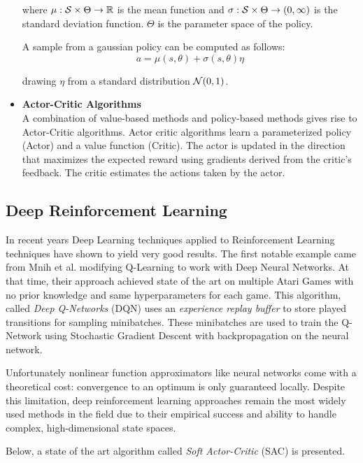\begin{itemize}
where $\mu: \mathcal{S} \times \Theta \to \mathbb{R}$ is the mean function and $\sigma: \mathcal{S} \times \Theta \to (0, \infty)$ is the standard deviation function.
$\Theta$ is the parameter space of the policy.

A sample from a gaussian policy can be computed as follows:
\begin{equation*}
    a = \mu(s, \theta) + \sigma(s, \theta) \eta
\end{equation*}

drawing $\eta$ from a standard distribution $\mathcal{N}(0,1)$.



\item \textbf{Actor-Critic Algorithms} \\
A combination of value-based methods and policy-based methods gives rise to Actor-Critic algorithms. Actor critic algorithms
learn a parameterized policy (Actor) and a value function (Critic).
The actor is updated in the direction that maximizes the expected reward using gradients derived from the critic's feedback.
The critic estimates the actions taken by the actor.

\end{itemize}

\subsection{Deep Reinforcement Learning}
In recent years Deep Learning techniques applied to Reinforcement Learning techniques have shown to yield very good results.
The first notable example came from Mnih et al. \cite{DQN} modifying Q-Learning to work with Deep Neural Networks.
At that time, their approach achieved state of the art on multiple Atari Games with no prior knowledge and same hyperparameters for each game. This algorithm, called
\textit{Deep Q-Networks} (DQN) uses an \textit{experience replay buffer} to store played transitions for sampling minibatches.
These minibatches are used to train the Q-Network using Stochastic Gradient Descent with backpropagation on the neural network.

Unfortunately nonlinear function approximators like neural networks come with a theoretical cost:
convergence to an optimum is only guaranteed locally. Despite this limitation, deep reinforcement learning approaches remain the most widely used methods in the field 
due to their empirical success and ability to handle complex, high-dimensional state spaces.


Below, a state of the art algorithm called \textit{Soft Actor-Critic} (SAC) is presented.

